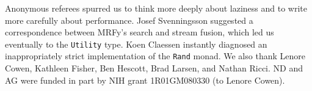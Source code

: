 \documentclass[preprint,nonatbib,blockstyle,times]{sigplanconf}
\newcommand\mrfy{MRFy} %
\begin{document}
%  

 

\acks

Anonymous referees spurred us to think
more deeply about laziness and to write more carefully about performance.
Josef Svenningsson suggested a correspondence between \mrfy's search
and stream fusion, which led us eventually to the \texttt{Utility} type.
Koen Claessen instantly diagnosed an inappropriately strict
implementation of the \texttt{Rand} monad.
We also thank Lenore Cowen, Kathleen Fisher, Ben Hescott, Brad
Larsen, and Nathan Ricci.
ND and AG were funded in part by NIH grant 1R01GM080330 (to Lenore Cowen).




\iffalse

\else
\end{document}
